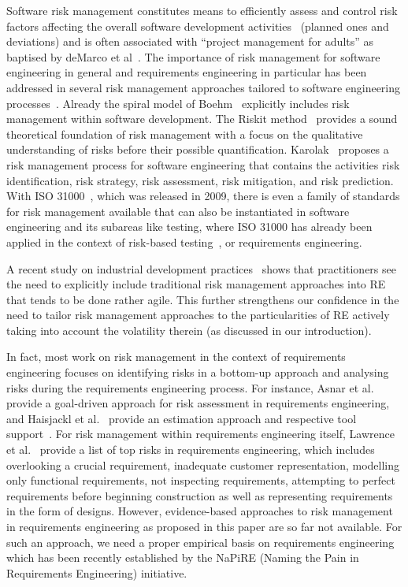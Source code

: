 \documentclass[lnbip]{svmultln}
\begin{document}
Software risk management constitutes means to efficiently assess and control risk factors affecting the overall software development activities~\cite{Boehm91} (planned ones and deviations) and is often associated with ``project management for adults'' as baptised by deMarco et al~\cite{deMarco+2003}. The importance of risk management for software engineering in general and requirements engineering in particular has been addressed in several risk management approaches tailored to software engineering processes~\cite{Pfleeger2000RiskyBusiness}. Already the spiral model of Boehm~\cite{Boehm1988SpiralModel} explicitly includes risk management within software development. The Riskit method~\cite{Kontio1999RiskManagementInSoftwareDevelopment} provides a sound theoretical foundation of risk management with a focus on the qualitative understanding of risks before their possible quantification. Karolak~\cite{Karolak1995SoftwareEngineeringRiskManagement} proposes a risk management process for software engineering that contains the activities risk identification, risk strategy, risk assessment, risk mitigation, and risk prediction. With ISO 31000~\cite{iso200931000}, which was released in 2009, there is even a family of standards for risk management available that can also be instantiated in software engineering and its subareas like testing, where ISO 31000 has already been applied in the context of risk-based testing~\cite{felderer2014taxonomy}, or requirements engineering. 

A recent study on industrial development practices~\cite{Kuhrmann:2017aa} shows that practitioners see the need to explicitly include traditional risk management approaches into RE that tends to be done rather agile. This further strengthens our confidence in the need to tailor risk management approaches to the particularities of RE actively taking into account the volatility therein (as discussed in our introduction).

In fact, most work on risk management in the context of requirements engineering focuses on identifying risks in a bottom-up approach and analysing risks during the requirements engineering process. For instance, Asnar et al.~\cite{asnar2011goal} provide a goal-driven approach for risk assessment in requirements engineering, and Haisjackl et al.~\cite{haisjackl2013riscal} provide an estimation approach and respective tool support~\cite{haisjackl2013riscal}. For risk management within requirements engineering itself, Lawrence et al.~\cite{lawrence2001top} provide a list of top risks in requirements engineering, which includes overlooking a crucial requirement, inadequate customer representation, modelling only functional requirements, not inspecting requirements, attempting to perfect requirements before beginning construction as well as representing requirements in the form of designs. However, evidence-based approaches to risk management in requirements engineering as proposed in this paper are so far not available. For such an approach, we need a proper empirical basis on requirements engineering which has been recently established by the NaPiRE (Naming the Pain in Requirements Engineering) initiative. 
\end{document}
